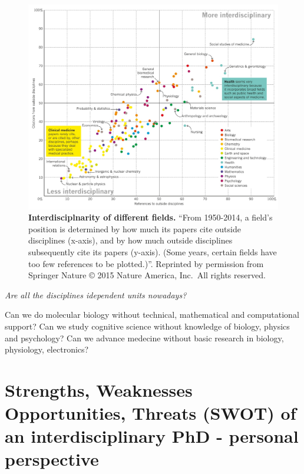 \documentclass[12pt,]{book}
\theoremstyle{definition}
\theoremstyle{definition}
\theoremstyle{definition}
\theoremstyle{remark}
\begin{document}
\begin{figure}

{\centering \includegraphics{figures-ext/interdisciplinary} 

}

\caption{\textbf{Interdisciplnarity of different
fields.} ``From 1950-2014, a field's position is determined by how much
its papers cite outside disciplines (x-axis), and by how much outside
disciplines subsequently cite its papers (y-axis). (Some years, certain
fields have too few references to be plotted.)''. Reprinted by
permission from Springer Nature \citep{VanNoorden2015} © 2015 Nature
America, Inc.~All rights reserved.}\label{fig:interdisciplinary}
\end{figure}









\emph{Are all the disciplines idependent units nowadays?}

Can we do molecular biology without technical, mathematical and
computational support? Can we study cognitive science without knowledge
of biology, physics and psychology? Can we advance medecine without
basic research in biology, physiology, electronics?

\hypertarget{strengths-weaknesses-opportunities-threats-swot-of-an-interdisciplinary-phd---personal-perspective}{%
\section*{Strengths, Weaknesses Opportunities, Threats (SWOT) of an
interdisciplinary PhD - personal
perspective}\label{strengths-weaknesses-opportunities-threats-swot-of-an-interdisciplinary-phd---personal-perspective}}
\end{document}
